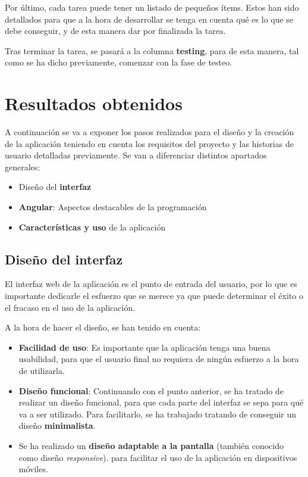 \documentclass{\ClassPath/viu-tfm-template}
\begin{document}
Por último, cada tarea puede tener un listado de pequeños ítems. Estos han sido detallados para que a la hora de desarrollar se tenga en cuenta qué es lo que se debe conseguir, y de esta manera dar por finalizada la tarea.

Tras terminar la tarea, se pasará a la columna \textbf{testing}, para de esta manera, tal como se ha dicho previamente, comenzar con la fase de testeo.



\chapter{Resultados obtenidos}

A continuación se va a exponer los pasos realizados para el diseño y la creación de la aplicación teniendo en cuenta los requisitos del proyecto y las historias de usuario detalladas previamente. Se van a diferenciar distintos apartados generales:

\begin{itemize}
    \item Diseño del \textbf{interfaz}
    \item \textbf{Angular}: Aspectos destacables de la programación
    \item \textbf{Características y uso} de la aplicación
\end{itemize}



\section{Diseño del interfaz}

El interfaz web de la aplicación es el punto de entrada del usuario, por lo que es importante dedicarle el esfuerzo que se merece ya que puede determinar el éxito o el fracaso en el uso de la aplicación.

A la hora de hacer el diseño, se han tenido en cuenta:
\begin{itemize}
    \item \textbf{Facilidad de uso}: Es importante que la aplicación tenga una buena usabilidad, para que el usuario final no requiera de ningún esfuerzo a la hora de utilizarla.
    \item \textbf{Diseño funcional}: Continuando con el punto anterior, se ha tratado de realizar un diseño funcional, para que cada parte del interfaz se sepa para qué va a ser utilizado. Para facilitarlo, se ha trabajado tratando de conseguir un diseño \textbf{minimalista}.
    \item Se ha realizado un \textbf{diseño adaptable a la pantalla} (también conocido como diseño \textit{responsive}). para facilitar el uso de la aplicación en dispositivos móviles.
\end{itemize}
\end{document}
